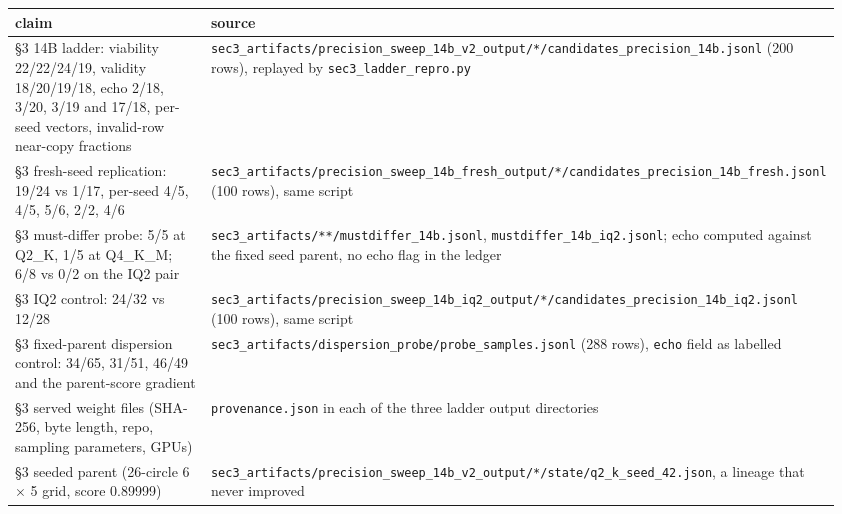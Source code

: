 \small
\begin{longtable}[]{@{}>{\raggedright\arraybackslash}p{0.400\linewidth}>{\raggedright\arraybackslash}p{0.560\linewidth}@{}}
\toprule\noalign{}
claim & source \\
\midrule\noalign{}
\endhead
\bottomrule\noalign{}
\endlastfoot
§3 14B ladder: viability 22/22/24/19, validity 18/20/19/18, echo 2/18, 3/20, 3/19 and 17/18, per-seed vectors, invalid-row near-copy fractions & \texttt{sec3\_\allowbreak artifacts/\allowbreak precision\_\allowbreak sweep\_\allowbreak 14b\_\allowbreak v2\_\allowbreak output/\allowbreak **/\allowbreak candidates\_\allowbreak precision\_\allowbreak 14b.jsonl} (200 rows), replayed by \texttt{sec3\_ladder\_repro.py} \\
§3 fresh-seed replication: 19/24 vs 1/17, per-seed 4/5, 4/5, 5/6, 2/2, 4/6 & \texttt{sec3\_\allowbreak artifacts/\allowbreak precision\_\allowbreak sweep\_\allowbreak 14b\_\allowbreak fresh\_\allowbreak output/\allowbreak **/\allowbreak candidates\_\allowbreak precision\_\allowbreak 14b\_\allowbreak fresh.jsonl} (100 rows), same script \\
§3 must-differ probe: 5/5 at Q2\_K, 1/5 at Q4\_K\_M; 6/8 vs 0/2 on the IQ2 pair & \texttt{sec3\_artifacts/**/mustdiffer\_14b.jsonl}, \texttt{mustdiffer\_14b\_iq2.jsonl}; echo computed against the fixed seed parent, no echo flag in the ledger \\
§3 IQ2 control: 24/32 vs 12/28 & \texttt{sec3\_\allowbreak artifacts/\allowbreak precision\_\allowbreak sweep\_\allowbreak 14b\_\allowbreak iq2\_\allowbreak output/\allowbreak **/\allowbreak candidates\_\allowbreak precision\_\allowbreak 14b\_\allowbreak iq2.jsonl} (100 rows), same script \\
§3 fixed-parent dispersion control: 34/65, 31/51, 46/49 and the parent-score gradient & \texttt{sec3\_\allowbreak artifacts/\allowbreak dispersion\_\allowbreak probe/\allowbreak probe\_\allowbreak samples.jsonl} (288 rows), \texttt{echo} field as labelled \\
§3 served weight files (SHA-256, byte length, repo, sampling parameters, GPUs) & \texttt{provenance.json} in each of the three ladder output directories \\
§3 seeded parent (26-circle 6 \(\times\) 5 grid, score 0.89999) & \texttt{sec3\_\allowbreak artifacts/\allowbreak precision\_\allowbreak sweep\_\allowbreak 14b\_\allowbreak v2\_\allowbreak output/\allowbreak **/\allowbreak state/\allowbreak q2\_\allowbreak k\_\allowbreak seed\_\allowbreak 42.json}, a lineage that never improved \\

\end{longtable}
